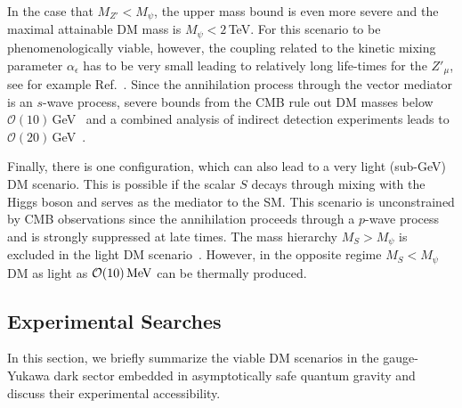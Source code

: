 \documentclass[aps,prd,twocolumn,preprintnumbers,superscriptaddress,nobibnotes,floatfix,longbibliography]{revtex4-1}
\begin{document}
In the case that $M_{Z'} < M_\psi$, the upper mass bound is even more severe and the maximal attainable DM mass is $M_\psi < 2$\,TeV. For this scenario to be phenomenologically viable, however, the coupling related to the kinetic mixing parameter $\alpha_\epsilon$ has to be very small leading to relatively long life-times for the $Z'_\mu$, see for example Ref.~\cite{0711.4866}. Since the annihilation process through the vector mediator is an $s$-wave process, severe bounds from the CMB rule out DM masses below $\mathcal{O}(10)$\,GeV~\cite{1909.08632} and a combined analysis of indirect detection experiments leads to $\mathcal{O}(20)$\,GeV~\cite{1805.10305}.  

Finally, there is one configuration, which can also lead to a very light (sub-GeV) DM scenario. This is possible if the scalar $S$ decays through mixing with the Higgs boson and serves as the mediator to the SM. This scenario is unconstrained by CMB observations since the annihilation proceeds through a $p$-wave process and is strongly suppressed at late times. The mass hierarchy $M_S > M_\psi$ is excluded in the light DM scenario~\cite{1512.04119}.  However, in the opposite regime  $M_S < M_\psi$ DM as light as  $\mathcal{O}(10)\, \rm MeV$ can be thermally produced. 

\subsection{Experimental Searches}
\label{sec:experimets}

In this section, we briefly summarize the viable DM scenarios in the gauge-Yukawa dark sector embedded in asymptotically safe quantum gravity and discuss their experimental accessibility. 
\end{document}
